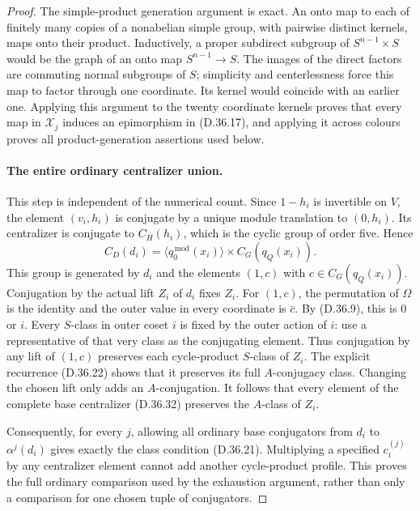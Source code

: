 \begin{proof}
The simple-product generation argument is exact.
An onto map to each of finitely many copies of a nonabelian
simple group, with pairwise distinct kernels, maps onto
their product.  Inductively, a proper subdirect subgroup
of \(S^{n-1}\times S\) would be the graph of an onto map
\(S^{n-1}\to S\).  The images of the direct factors are
commuting normal subgroups of \(S\); simplicity and
centerlessness force this map to factor through one
coordinate.  Its kernel would coincide with an earlier
one.  Applying this argument to the twenty coordinate
kernels proves that every map in \(\mathscr X_j\) induces
an epimorphism in \textup{(D.36.17)}, and applying it
across colours proves all product-generation assertions
used below.

\paragraph{The entire ordinary centralizer union.}
This step is independent of the numerical count.
Since \(1-h_i\) is invertible on \(V\), the element
\((v_i,h_i)\) is conjugate by a unique module translation
to \((0,h_i)\).  Its centralizer is conjugate to
\(C_H(h_i)\), which is the cyclic group of order five.
Hence
\[
 C_D(d_i)=\langle q_0^{\,\mathrm{mod}}(x_i)\rangle
                       \times C_G(q_Q(x_i)).
 \tag{D.36.32}
\]
This group is generated by \(d_i\) and the elements
\((1,c)\) with \(c\in C_G(q_Q(x_i))\).
Conjugation by the actual lift \(Z_i\) of \(d_i\)
fixes \(Z_i\).  For \((1,c)\), the permutation of
\(\Omega\) is the identity and the outer value in
every coordinate is \(\bar c\).  By
\textup{(D.36.9)}, this is \(0\) or \(i\).
Every \(S\)-class in outer coset \(i\) is fixed by
the outer action of \(i\): use a representative of
that very class as the conjugating element.
Thus conjugation by any lift of \((1,c)\) preserves
each cycle-product \(S\)-class of \(Z_i\).
The explicit recurrence \textup{(D.36.22)} shows
that it preserves its full \(A\)-conjugacy class.
Changing the chosen lift only adds an \(A\)-conjugation.
It follows that every element of the complete base
centralizer \textup{(D.36.32)} preserves the
\(A\)-class of \(Z_i\).

Consequently, for every \(j\), allowing all ordinary
base conjugators from \(d_i\) to \(\alpha^j(d_i)\)
gives exactly the class condition
\textup{(D.36.21)}.  Multiplying a specified
\(c_i^{(j)}\) by any centralizer element cannot
add another cycle-product profile.  This proves
the full ordinary comparison used by the exhaustion
argument, rather than only a comparison for one
chosen tuple of conjugators.


\end{proof}
